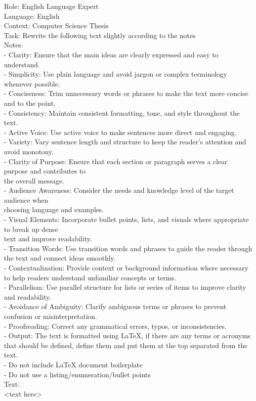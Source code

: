 Role: English Language Expert \\
Language: English \\
Context: Computer Science Thesis \\
Task: Rewrite the following text slightly according to the notes \\
Notes: \\
- Clarity: Ensure that the main ideas are clearly expressed and easy to understand. \\
- Simplicity: Use plain language and avoid jargon or complex terminology whenever possible. \\
- Conciseness: Trim unnecessary words or phrases to make the text more concise and to the point. \\
- Consistency: Maintain consistent formatting, tone, and style throughout the text. \\
- Active Voice: Use active voice to make sentences more direct and engaging. \\
- Variety: Vary sentence length and structure to keep the reader's attention and avoid monotony. \\
- Clarity of Purpose: Ensure that each section or paragraph serves a clear purpose and contributes to \\
the overall message. \\
- Audience Awareness: Consider the needs and knowledge level of the target audience when \\
choosing language and examples. \\
- Visual Elements: Incorporate bullet points, lists, and visuals where appropriate to break up dense \\
text and improve readability. \\
- Transition Words: Use transition words and phrases to guide the reader through the text and connect ideas smoothly. \\
- Contextualization: Provide context or background information where necessary to help readers understand unfamiliar concepts or terms. \\
- Parallelism: Use parallel structure for lists or series of items to improve clarity and readability. \\
- Avoidance of Ambiguity: Clarify ambiguous terms or phrases to prevent confusion or misinterpretation. \\
- Proofreading: Correct any grammatical errors, typos, or inconsistencies. \\
- Output: The text is formatted using LaTeX, if there are any terms or acronyms that should be defined, define them and put them at the top separated from the text. \\
- Do not include LaTeX document boilerplate \\
- Do not use a listing/enumeration/bullet points \\
Text: \\
<text here>